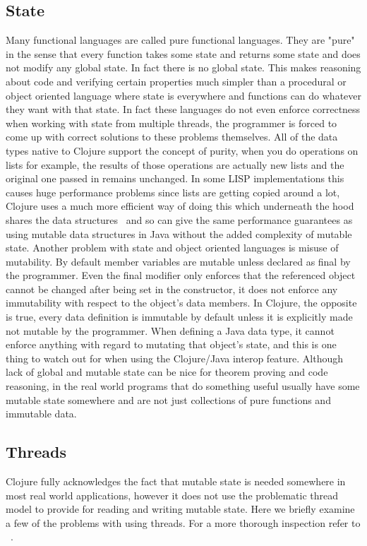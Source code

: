 \subsection{State}
Many functional languages are called pure functional languages. They are "pure" in the sense that every function takes some state and returns some state and does not modify any global state. In fact there is no global state. This makes reasoning about code and verifying certain properties much simpler than a procedural or object oriented language where state is everywhere and functions can do whatever they want with that state. In fact these languages do not even enforce correctness when working with state from multiple threads, the programmer is forced to come up with correct solutions to these problems themselves. All of the data types native to Clojure support the concept of purity, when you do operations on lists for example, the results of those operations are actually new lists and the original one passed in remains unchanged. In some LISP implementations this causes huge performance problems since lists are getting copied around a lot, Clojure uses a much more efficient way of doing this which underneath the hood shares the data structures~\cite{cljDataStructures} and so can give the same performance guarantees as using mutable data structures in Java without the added complexity of mutable state. Another problem with state and object oriented languages is misuse of mutability. By default member variables are mutable unless declared as final by the programmer. Even the final modifier only enforces that the referenced object cannot be changed after being set in the constructor, it does not enforce any immutability with respect to the object's data members. In Clojure, the opposite is true, every data definition is immutable by default unless it is explicitly made not mutable by the programmer. When defining a Java data type, it cannot enforce anything with regard to mutating that object's state, and this is one thing to watch out for when using the Clojure/Java interop feature. Although lack of global and mutable state can be nice for theorem proving and code reasoning, in the real world programs that do something useful usually have some mutable state somewhere and are not just collections of pure functions and immutable data.  

\subsection{Threads}
Clojure fully acknowledges the fact that mutable state is needed somewhere in most real world applications, however it does not use the problematic thread model to provide for reading and writing mutable state. Here we briefly examine a few of the problems with using threads. For a more thorough inspection refer to ~\cite{1076522}.

